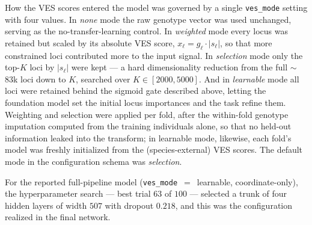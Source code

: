 \documentclass[twocolumn,10pt]{article}
\begin{document}
How the VES scores entered the model was governed by a single \texttt{ves\_mode} setting with four
values. In \emph{none} mode the raw genotype vector was used unchanged, serving as the
no-transfer-learning control. In \emph{weighted} mode every locus was retained but scaled by its
absolute VES score, $x_\ell = g_\ell \cdot |s_\ell|$, so that more constrained loci contributed more
to the input signal. In \emph{selection} mode only the top-$K$ loci by $|s_\ell|$ were kept --- a
hard dimensionality reduction from the full $\sim$83k loci down to $K$, searched over $K \in [2000,
5000]$. And in \emph{learnable} mode all loci were retained behind the sigmoid gate described above,
letting the foundation model set the initial locus importances and the task refine them. Weighting
and selection were applied per fold, after the within-fold genotype imputation computed from the
training individuals alone, so that no held-out information leaked into the transform; in learnable
mode, likewise, each fold's model was freshly initialized from the (species-external) VES scores.
The default mode in the configuration schema was \emph{selection}.

For the reported full-pipeline model (\texttt{ves\_mode}~$=$~learnable, coordinate-only), the
hyperparameter search --- best trial $63$ of $100$ --- selected a trunk of four hidden layers of
width $507$ with dropout $0.218$, and this was the configuration realized in the final network.
\end{document}
